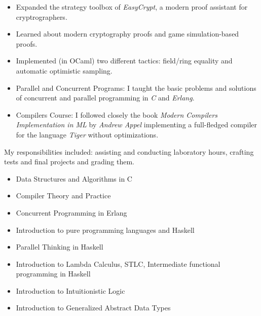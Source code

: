     \begin{itemize}
        \item Expanded the strategy toolbox of
            \emph{EasyCrypt}, a modern proof assistant for cryptrographers.
        \item Learned about modern cryptography proofs and game simulation-based proofs.
        \item Implemented (in OCaml) two different tactics: field/ring equality
            and automatic optimistic sampling.
    \end{itemize}

\newpage


    \begin{itemize}
        \item Parallel and Concurrent Programs: I taught the basic
            problems and solutions of concurrent and parallel programming in \emph{C} and \emph{Erlang}.
        \item Compilers Course: I followed closely the book \emph{Modern
                Compilers Implementation in ML} by \emph{Andrew Appel}
            implementing a full-fledged compiler for the language
            \emph{Tiger} without optimizations.
    \end{itemize}
    \divider

    My responsibilities included: assisting and conducting laboratory
    hours, crafting tests and final projects and grading them.
    \begin{itemize}
        \item {Data Structures and Algorithms in C}
        \item {Compiler Theory and Practice}
        \item {Concurrent Programming in Erlang}
        \item {Introduction to pure programming languages and Haskell}
        \item {Parallel Thinking in Haskell}
        \item {Introduction to Lambda Calculus, STLC, Intermediate functional programming in Haskell}
        \item {Introduction to Intuitionistic Logic}
        \item {Introduction to Generalized Abstract Data Types}
    \end{itemize}

